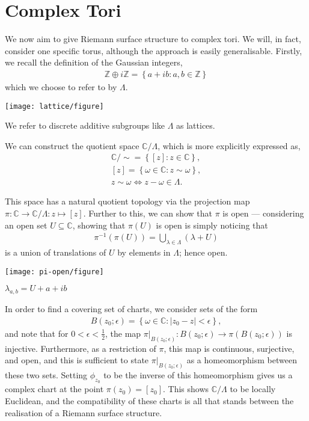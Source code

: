 \section{Complex Tori}\label{sec:complex-tori}
We now aim to give Riemann surface structure to complex tori. We will, in fact,
consider one specific torus, although the approach is easily generalisable.
Firstly, we recall the definition of the Gaussian integers,
\begin{align*}
	\mathbb{Z} \oplus i \mathbb{Z} = \left\{ a + ib: a,b \in \mathbb{Z} \right\}
\end{align*}
which we choose to refer to by $ \Lambda $.

\begin{marginfigure}
	\centering
	\texttt{[image: lattice/figure]}
	\caption{We refer to discrete additive subgroups like $ \Lambda $ as lattices.}
\end{marginfigure}

We can construct the quotient space $ \mathbb{C}/\Lambda $, which is more
explicitly expressed as,
\begin{gather*}
	\mathbb{C}/{\sim} = \left\{ [z]: z \in \mathbb{C} \right\},\\
	[z] = \left\{ \omega \in \mathbb{C}: z \sim \omega \right\},\\
	z\sim \omega \iff z-\omega \in \Lambda.
\end{gather*}

This space has a natural quotient topology via the projection map $
	\pi:\mathbb{C}\to \mathbb{C}/\Lambda: z \mapsto [z] $. Further to this, we can
show that $ \pi $ is open --- considering an open set $ U \subseteq \mathbb{C}
$, showing that $ \pi(U) $ is open is simply noticing that
\begin{align*}
	\pi ^{-1}(\pi(U)) = \bigcup_{\lambda \in \Lambda}^{}{(\lambda + U)}
\end{align*}
is a union of translations of $ U $ by elements in $ \Lambda $; hence open.

\begin{marginfigure}
	\centering
	\texttt{[image: pi-open/figure]}
	\caption{$ \lambda _{a,b} = U + a + ib $}
\end{marginfigure}

In order to find a covering set of charts, we consider sets of the form
\begin{align*}
	B(z_0;\epsilon) = \left\{ \omega \in \mathbb{C}: |z_0-z|<\epsilon \right\},
\end{align*}
and note that for $ 0<\epsilon<\frac{1}{2} $, the map $
	\pi|_{B(z_0;\epsilon)}:B(z_0;\epsilon) \to \pi(B(z_0;\epsilon))$ is injective.
Furthermore, as a restriction of $ \pi $, this map is continuous, surjective,
and open, and this is sufficient to state $ \pi|_{B(z_0;\epsilon)} $ as a
homeomorphism between these two sets. Setting $ \phi _{z_0} $ to be the inverse of
this homeomorphism gives us a complex chart at the point $ \pi(z_0) = [z_0] $.
This shows $ \mathbb{C}/\Lambda $ to be locally Euclidean, and the compatibility
of these charts is all that stands between the realisation of a Riemann surface
structure.

